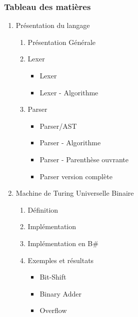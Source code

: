 \documentclass{beamer}
\newcommand{\bs}{B\# }
\begin{document}
    \begin{frame}
        \frametitle{Tableau des matières}
        \begin{enumerate}
            \item Présentation du langage
            \begin{enumerate}
                \item Présentation Générale
                \item Lexer
                \begin{itemize}
                    \item Lexer
                    \item Lexer - Algorithme 
                \end{itemize}
                \item Parser
                \begin{itemize}
                    \item Parser/AST 
                    \item Parser - Algorithme 
                    \item Parser - Parenthèse ouvrante
                    \item Parser version complète
                \end{itemize}
            \end{enumerate}
            \item Machine de Turing Universelle Binaire 
            \begin{enumerate}
                \item Définition 
                \item Implémentation
                \item Implémentation en \bs
                \item Exemples et résultats
                \begin{itemize}
                    \item Bit-Shift
                    \item Binary Adder
                    \item Overflow
                \end{itemize}
            \end{enumerate}
        \end{enumerate}
    \end{frame}
\end{document}
